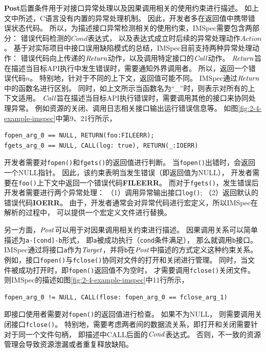 \textbf{Post}后置条件用于对接口异常处理以及因果调用相关的使用约束进行描述。
如上文中所述，C语言没有内置的异常处理机制。
因此，开发者多在返回值中携带错误状态代码。
所以，为描述接口异常检测相关的使用约束，IMSpec需要包含两部分：
错误代码检测的$\mathit{Cond}$表达式，
以及表达式成立时后续的异常处理动作$\mathit{Action}$。
基于对实际项目中接口误用缺陷模式的总结，IMSpec目前支持两种异常处理动作：
错误代码向上传递的$\mathit{Return}$动作，以及调用特定接口的$\mathit{Call}$动作。
$\mathit{Return}$旨在描述当目标API执行中发生错误时，需要通知外界调用者。
所以，返回一个错误代码$n$。
特别地，针对于不同的上下文，返回值可能不同。
IMSpec通过$\mathit{Return}$中的函数名进行区别。
同时，如上文所示当函数名为“\_”时，则表示对所有的上下文适用。
$\mathit{Call}$旨在描述当目标API执行错误时，需要调用其他的接口来协同处理异常。
例如资源的关闭、调用日志相关接口输出运行错误信息等。
如图\ref{fig:2-4-example-imspec}中第9、21行所示，
\begin{lstlisting}[language={[ANSI]C},
basicstyle=\linespread{0.8}\listingsfont,
numbers=none,
xleftmargin=.15\textwidth]
fopen_arg_0 == NULL, RETURN(foo:FILEERR);
fgets_arg_0 == NULL, CALL(log: true), RETURN(_:IOERR)
\end{lstlisting}
开发者需要对\texttt{fopen()}和\texttt{fgets()}的返回值进行判断。
当\texttt{fopen()}出错时，会返回一个NULL指针。
因此，该约束表明当发生错误（即返回值为NULL），
开发者需要在\texttt{foo()}上下文中返回一个错误代码\textbf{FILEERR}。
而对于\texttt{fgets()}，发生错误后开发者需要进行两个异常处理：
（1）调用异常输出接口\texttt{log()};
（2）返回默认的错误代码\textbf{IOERR}。
由于，开发者通常会对异常代码进行宏定义，所以IMSpec在解析的过程中，
可以提供一个宏定义文件进行替换。

另一方面，$\mathit{Post}$可以用于对因果调用相关约束进行描述。
因果调用关系可以简单描述为\texttt{a-[cond]-b}形式，
即\texttt{a}被成功执行（\texttt{cond}条件满足），
那么就调用\texttt{b}接口。
IMSpec通过将接口\texttt{a}作为$\mathit{Target}$，并将\texttt{b}在$\mathit{Post}$中描述的方式定义这种约束关系。
例如，接口\texttt{fopen()}与\texttt{fclose()}协同对文件的打开和关闭进行管理。
同时，当文件被成功打开时，即\texttt{fopen()}返回值不为空时，
才需要调用\texttt{fclose()}关闭文件。
则IMSpec的描述如图\ref{fig:2-4-example-imspec}中11行所示，
\begin{lstlisting}[language={[ANSI]C},
basicstyle=\linespread{0.8}\listingsfont,
numbers=none,
xleftmargin=.15\textwidth]
fopen_arg_0 != NULL, CALL(flose: fopen_arg_0 == fclose_arg_1)
\end{lstlisting}
即接口使用者需要对\texttt{fopen()}的返回值进行检查。
如果不为NULL，
则需要调用关闭接口\texttt{fclose()}。
特别地，需要考虑两者间的数据流关系，即打开和关闭需要针对于同一个文件句柄，
即描述中CALL后面的$\mathit{Cond}$表达式。
否则，不一致的资源管理会导致资源泄漏或者重复释放缺陷。


